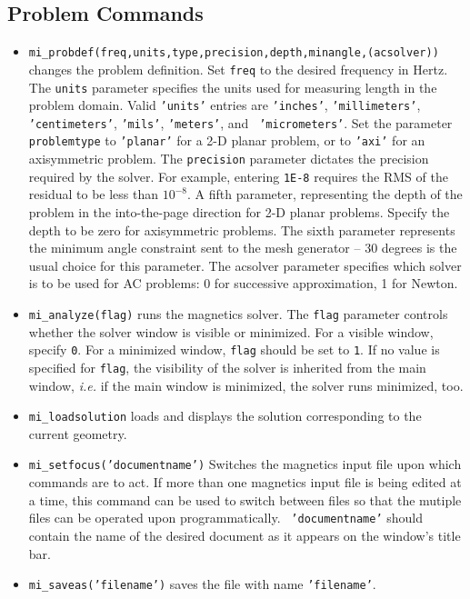 \subsection{Problem Commands}

\begin{itemize}
\item{\tt mi\_probdef(freq,units,type,precision,depth,minangle,(acsolver))} changes the
problem definition. Set {\tt freq} to the desired frequency in
Hertz.  The {\tt units} parameter specifies the units used for
measuring length in the problem domain.  Valid {\tt 'units'}
entries are {\tt 'inches'}, {\tt 'millimeters'}, {\tt
'centimeters'}, {\tt 'mils'}, {\tt 'meters'}, and {\tt
'micrometers'}. Set the parameter {\tt problemtype} to {\tt 'planar'} for a 2-D
planar problem, or to {\tt 'axi'} for an axisymmetric problem. The
{\tt precision} parameter dictates the precision required by the
solver.  For example, entering {\tt 1E-8} requires the RMS of the
residual to be less than $10^{-8}$.  A fifth parameter, representing the depth of
the problem in the into-the-page direction for 2-D planar problems.  Specify the depth
to be zero for axisymmetric problems. The sixth parameter represents the minimum angle
constraint sent to the mesh generator -- 30 degrees is the usual
choice for this parameter.  The acsolver parameter specifies which solver is to be
used for AC problems: 0 for successive approximation, 1 for Newton.

\item{\tt mi\_analyze(flag)}
runs the magnetics solver.  The {\tt flag} parameter
controls whether the solver window is visible or minimized.  For a
visible window,  specify {\tt 0}. For a minimized window, {\tt flag} should be set to {\tt 1}.
If no value is specified for {\tt flag}, the visibility of the solver is inherited from the main window,
{\em i.e.} if the main window is minimized, the solver runs minimized, too.

\item{\tt mi\_loadsolution} loads and displays the solution corresponding to the
current geometry.

\item {\tt mi\_setfocus('documentname')} Switches the
magnetics input file upon which commands are to act. If
more than one magnetics input file is being edited at a time,
this command can be used to switch between files so that the
mutiple files can be operated upon programmatically. {\tt
'documentname'} should contain the name of the desired document as
it appears on the window's title bar.

\item{\tt mi\_saveas('filename')} saves the file with name {\tt 'filename'}.

\end{itemize}

